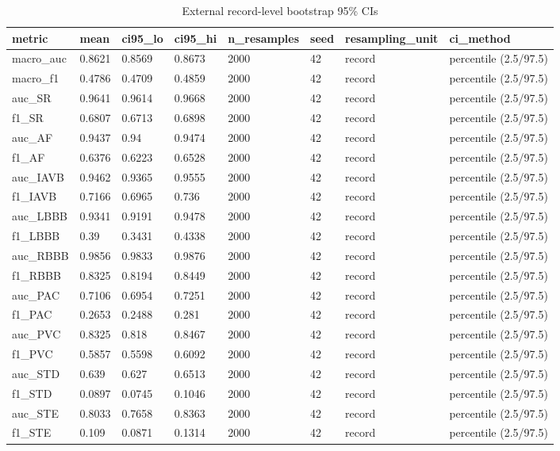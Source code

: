 \begin{table}[htbp]\centering\small
\caption{External record-level bootstrap 95\% CIs}\label{tab:extci}
\begin{tabular}{llllllll}
\hline
metric & mean & ci95_lo & ci95_hi & n_resamples & seed & resampling_unit & ci_method \\
\hline
macro_auc & 0.8621 & 0.8569 & 0.8673 & 2000 & 42 & record & percentile (2.5/97.5) \\
macro_f1 & 0.4786 & 0.4709 & 0.4859 & 2000 & 42 & record & percentile (2.5/97.5) \\
auc_SR & 0.9641 & 0.9614 & 0.9668 & 2000 & 42 & record & percentile (2.5/97.5) \\
f1_SR & 0.6807 & 0.6713 & 0.6898 & 2000 & 42 & record & percentile (2.5/97.5) \\
auc_AF & 0.9437 & 0.94 & 0.9474 & 2000 & 42 & record & percentile (2.5/97.5) \\
f1_AF & 0.6376 & 0.6223 & 0.6528 & 2000 & 42 & record & percentile (2.5/97.5) \\
auc_IAVB & 0.9462 & 0.9365 & 0.9555 & 2000 & 42 & record & percentile (2.5/97.5) \\
f1_IAVB & 0.7166 & 0.6965 & 0.736 & 2000 & 42 & record & percentile (2.5/97.5) \\
auc_LBBB & 0.9341 & 0.9191 & 0.9478 & 2000 & 42 & record & percentile (2.5/97.5) \\
f1_LBBB & 0.39 & 0.3431 & 0.4338 & 2000 & 42 & record & percentile (2.5/97.5) \\
auc_RBBB & 0.9856 & 0.9833 & 0.9876 & 2000 & 42 & record & percentile (2.5/97.5) \\
f1_RBBB & 0.8325 & 0.8194 & 0.8449 & 2000 & 42 & record & percentile (2.5/97.5) \\
auc_PAC & 0.7106 & 0.6954 & 0.7251 & 2000 & 42 & record & percentile (2.5/97.5) \\
f1_PAC & 0.2653 & 0.2488 & 0.281 & 2000 & 42 & record & percentile (2.5/97.5) \\
auc_PVC & 0.8325 & 0.818 & 0.8467 & 2000 & 42 & record & percentile (2.5/97.5) \\
f1_PVC & 0.5857 & 0.5598 & 0.6092 & 2000 & 42 & record & percentile (2.5/97.5) \\
auc_STD & 0.639 & 0.627 & 0.6513 & 2000 & 42 & record & percentile (2.5/97.5) \\
f1_STD & 0.0897 & 0.0745 & 0.1046 & 2000 & 42 & record & percentile (2.5/97.5) \\
auc_STE & 0.8033 & 0.7658 & 0.8363 & 2000 & 42 & record & percentile (2.5/97.5) \\
f1_STE & 0.109 & 0.0871 & 0.1314 & 2000 & 42 & record & percentile (2.5/97.5) \\
\hline
\end{tabular}
\end{table}
